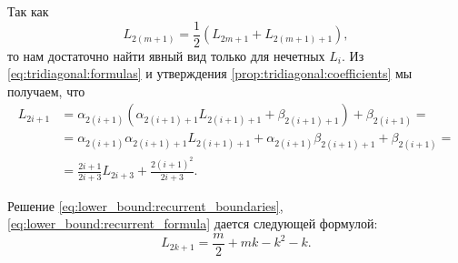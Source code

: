 Так как 
\[
L_{2(m + 1)} = \frac{1}{2} (L_{2m+1} + L_{2(m+1) + 1}),
\]
то нам достаточно найти явный вид только для нечетных $ L_i $. Из \eqref{eq:tridiagonal:formulas} и утверждения \ref{prop:tridiagonal:coefficients} мы получаем, что
\begin{align}
\label{eq:lower_bound:recurrent_formula}
L_{2i+1} &= \alpha_{2(i+1)}(
    \alpha_{2(i+1)+1} L_{2(i+1)+1} + \beta_{2(i+1)+1}
    ) + \beta_{2(i+1)} = \nonumber \\
&= \alpha_{2(i+1)}\alpha_{2(i+1)+1} L_{2(i+1)+1} +
    \alpha_{2(i+1)}\beta_{2(i+1)+1} + \beta_{2(i+1)} = \nonumber \\
&= \frac{2i+1}{2i+3} L_{2i+3} + \frac{2(i+1)^2}{2i+3}.
\end{align}

\begin{prop}
\label{prop:lower_bound:solution}
Решение \eqref{eq:lower_bound:recurrent_boundaries}, \eqref{eq:lower_bound:recurrent_formula} дается следующей формулой:
\begin{equation}
\label{eq:lower_bound:recurrence_solution}
L_{2k+1} = \frac{m}{2} + mk - k^2 - k.
\end{equation}
\end{prop}
